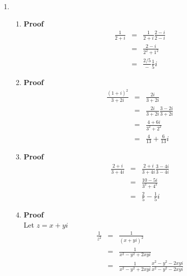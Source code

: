 \documentclass{article}%
\newenvironment{proof}[1][]{\begin{samepage}\textbf{Proof #1} }{\end{samepage}}
\begin{document}
\begin{enumerate}
\begin{enumerate}[label*=\arabic*.]
        \item %
        \begin{enumerate}[label=\alph*]
            \item %
            \begin{proof}
                \begin{eqnarray*}
                    \frac{1}{2+i}&=&\frac{1}{2+i}\frac{2-i}{2-i} \\
                                 &=&\frac{2-i}{2^2+1^2} \\
                                 &=&\frac{2/5}-\frac{1}{5}i
                \end{eqnarray*}
            \end{proof}
            \item %
            \begin{proof}
                \begin{eqnarray*}
                    \frac{(1+i)^2}{3+2i}&=&\frac{2i}{3+2i} \\
                                        &=&\frac{2i}{3+2i} \frac{3-2i}{3+2i} \\
                                        &=&\frac{4+6i}{3^2+2^2} \\
                                        &=&\frac{4}{13}+\frac{6}{13}i
                \end{eqnarray*}
            \end{proof}
            \item %
            \begin{proof}
                \begin{eqnarray*}
                    \frac{2+i}{3+4i}&=&\frac{2+i}{3+4i} \frac{3-4i}{3-4i} \\
                                    &=&\frac{10-5i}{3^2+4^2} \\
                                    &=&\frac{2}{5}-\frac{1}{5}i
                \end{eqnarray*}
            \end{proof}
            \item %
            \begin{proof}
                \\ Let $z=x+yi$
                \begin{eqnarray*}
                    \frac{1}{z^2}&=&\frac{1}{(x+yi)^2} \\
                                 &=&\frac{1}{x^2-y^2+2xyi} \\
                                 &=&\frac{1}{x^2-y^2+2xyi}\frac{x^2-y^2-2xyi}{x^2-y^2-2xyi} \\

\end{eqnarray*}
\end{proof}
\end{enumerate}
\end{enumerate}
\end{enumerate}
\end{document}
